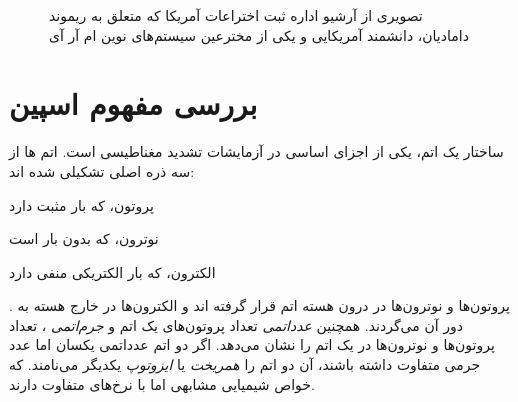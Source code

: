 \begin{figure}
	\centering
	{}
	\caption{تصویری از آرشیو اداره ثبت اختراعات آمریکا که متعلق به ریموند دامادیان، دانشمند آمریکایی و یکی از مخترعین سیستم‌های نوین ام آر آی}
	\label{fig:Damadian_invention}
\end{figure}


\section{بررسی مفهوم اسپین}
 

ساختار یک اتم، یکی از اجزای اساسی در آزمایشات تشدید مغناطیسی است. اتم ها از سه ذره اصلی 
تشکیلی شده اند:
\begin{enuminline}
	\item پروتون، که بار مثبت دارد
	\item نوترون، که بدون بار است
	\item الکترون، که بار الکتریکی منفی دارد
\end{enuminline}.
پروتون‌ها و نوترون‌ها در درون هسته اتم قرار گرفته اند و الکترون‌ها در خارج هسته به دور آن می‌گردند.
همچنین \textit{عدد‌اتمی}
تعداد پروتون‌های یک اتم و \textit{جرم‌اتمی}
، تعداد پروتون‌ها و نوترون‌ها در یک اتم را نشان می‌دهد. اگر دو اتم عدد‌‌اتمی یکسان اما عدد جرمی متفاوت داشته باشند، آن دو اتم را \textit{همریخت} یا \textit{ایزوتوپ}
یکدیگر می‌نامند. که خواص شیمیایی مشابهی اما با نرخ‌های متفاوت دارند.


